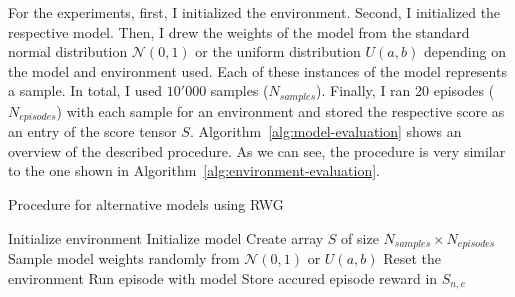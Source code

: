 For the experiments, first, I initialized the environment. Second, I initialized the respective model. Then, I drew the weights of the model from the standard normal distribution $\mathcal{N}(0,1)$ or the uniform distribution $U(a,b)$ depending on the model and environment used. Each of these instances of the model represents a sample. In total, I used $10'000$ samples ($N_{samples}$). Finally, I ran 20 episodes ($N_{episodes}$) with each sample for an environment and stored the respective score as an entry of the score tensor $S$. Algorithm~\ref{alg:model-evaluation} shows an overview of the described procedure. As we can see, the procedure is very similar to the one shown in Algorithm~\ref{alg:environment-evaluation}.
\begin{algorithm}
\caption{Procedure for alternative models using RWG}
\begin{algorithmic}[1]
\State Initialize environment
\State Initialize model
\State Create array $S$ of size $N_{samples} \times N_{episodes}$
    \State Sample model weights randomly from $\mathcal{N}(0,1)$ or $U(a, b)$
      \State Reset the environment
      \State Run episode with model
      \State Store accured episode reward in $S_{n,e}$
    \EndFor
\EndFor
\end{algorithmic}
\label{alg:model-evaluation}
\end{algorithm}


